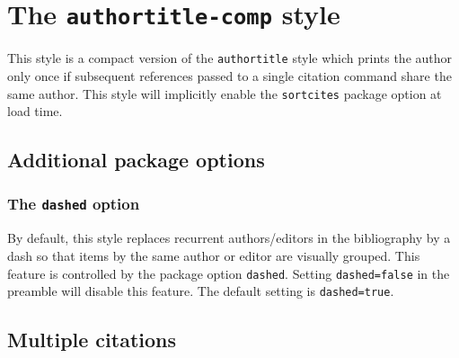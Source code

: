 \documentclass[a4paper]{article}
\begin{document}
\section*{The \texttt{authortitle-comp} style}

This style is a compact version of the \texttt{authortitle} style
which prints the author only once if subsequent references passed to
a single citation command share the same author. This style will
implicitly enable the \texttt{sortcites} package option at load
time.

\subsection*{Additional package options}

\subsubsection*{The \texttt{dashed} option}

By default, this style replaces recurrent authors/editors in the
bibliography by a dash so that items by the same author or editor
are visually grouped. This feature is controlled by the package
option \texttt{dashed}. Setting \texttt{dashed=false} in the
preamble will disable this feature. The default setting is
\texttt{dashed=true}.

\subsection*{Multiple citations}

\cite{aristotle:rhetoric,averroes/bland,aristotle:physics,aristotle:poetics}

\clearpage
\printbibliography
\end{document}
